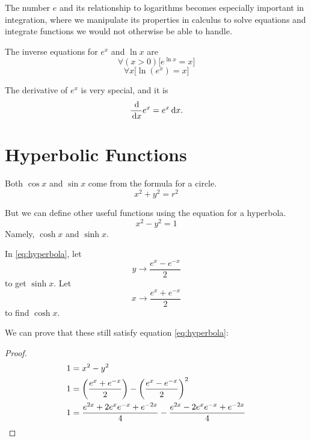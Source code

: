 The number $e$ and its relationship to logarithms becomes especially important in integration,
where we manipulate its properties in calculus to solve equations and integrate functions we would not
otherwise be able to handle.

The inverse equations for $e^x$ and $\ln x$ are
\begin{equation}
  \forall (x>0)\big[e^{\ln x}=x\big]
  \label{eq:exinv1}
\end{equation}
\begin{equation}
  \forall x\big[\ln{(e^x)} =x\big]
  \label{eq:exinv2}
\end{equation}

The derivative of $e^x$ is very special, and it is
\begin{equation}
  \frac{\,\mathrm{d}}{\,\mathrm{d} x} e^x = e^x \,\mathrm{d} x.
  \label{eq:ddxex}
\end{equation}


\section{Hyperbolic Functions}
Both \(\cos x\) and \(\sin x\) come from the formula for a circle.
\begin{equation}
  x^2 + y^2=r^2
  \label{eq:circle}
\end{equation}

But we can define other useful functions using the equation for a hyperbola.
\begin{equation}
  x^2-y^2=1
  \label{eq:hyperbola}
\end{equation}
Namely, \(\cosh x\) and \(\sinh x\).

In \ref{eq:hyperbola}, let \[ y \to \frac{e^x-e^{-x}}{2}\] to get \(\sinh x\).
Let \[ x \to \frac{e^x+e^{-x}}{2}\] to find \(\cosh x\).

We can prove that these still satisfy equation \ref{eq:hyperbola}:

\begin{proof}
  \begin{align*}
    1&=x^2-y^2 \\
    1&=\left( \frac{e^x+e^{-x}}{2} \right) - \left( \frac{e^x - e^{-x}}{2}
    \right)^2 \\
    1&=\frac{e^{2x}+2e^xe^{-x}+e^{-2x}}{4}-\frac{e^{2x}-2e^xe^{-x}+e^{-2x}}{4}
    \qedhere
  \end{align*}
\end{proof}
